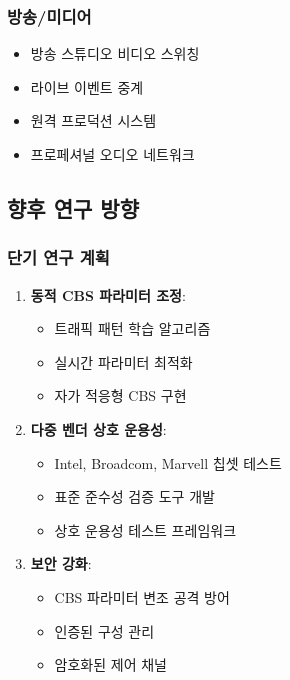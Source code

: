 \documentclass[twocolumn,10pt]{article}
\begin{document}
\subsubsection{방송/미디어}

\begin{itemize}
    \item 방송 스튜디오 비디오 스위칭
    \item 라이브 이벤트 중계
    \item 원격 프로덕션 시스템
    \item 프로페셔널 오디오 네트워크
\end{itemize}

\subsection{향후 연구 방향}

\subsubsection{단기 연구 계획}

\begin{enumerate}
    \item \textbf{동적 CBS 파라미터 조정}: 
        \begin{itemize}
            \item 트래픽 패턴 학습 알고리즘
            \item 실시간 파라미터 최적화
            \item 자가 적응형 CBS 구현
        \end{itemize}
    
    \item \textbf{다중 벤더 상호 운용성}:
        \begin{itemize}
            \item Intel, Broadcom, Marvell 칩셋 테스트
            \item 표준 준수성 검증 도구 개발
            \item 상호 운용성 테스트 프레임워크
        \end{itemize}
    
    \item \textbf{보안 강화}:
        \begin{itemize}
            \item CBS 파라미터 변조 공격 방어
            \item 인증된 구성 관리
            \item 암호화된 제어 채널
        \end{itemize}
\end{enumerate}
\end{document}
